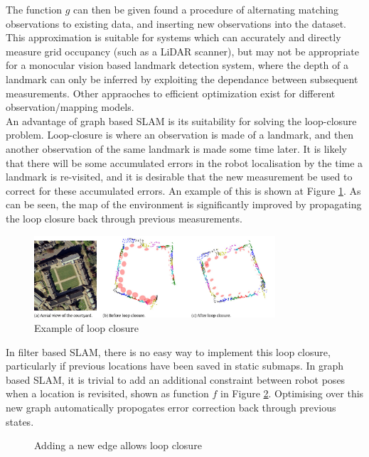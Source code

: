 \documentclass[capstone_report.tex]{subfiles}
\begin{document}
The function $g$ can then be given found a procedure of alternating matching observations to existing data, and inserting new observations into the dataset. This approximation is suitable for systems which can accurately and directly measure grid occupancy (such as a LiDAR scanner), but may not be appropriate for a monocular vision based landmark detection system, where the depth of a landmark can only be inferred by exploiting the dependance between subsequent measurements. Other appraoches to efficient optimization exist for different observation/mapping models.\\

An advantage of graph based SLAM is its suitability for solving the loop-closure problem. Loop-closure is where an observation is made of a landmark, and then another observation of the same landmark is made some time later. It is likely that there will be some accumulated errors in the robot localisation by the time a landmark is re-visited, and it is desirable that the new measurement be used to correct for these accumulated errors. An example of this is shown at Figure \ref{fig:loopClose}. As can be seen, the map of the environment is significantly improved by propagating the loop closure back through previous measurements.

\begin{figure}[H]
   \centering
   \includegraphics[width=0.8\textwidth]{imgs/loopClosure.png}
   \caption{Example of loop closure\label{fig:loopClose}}
\end{figure} 

In filter based SLAM, there is no easy way to implement this loop closure, particularly if previous locations have been saved in static submaps. In graph based SLAM, it is trivial to add an additional constraint between robot poses when a location is revisited, shown as function $f$ in Figure \ref{fig:loopClose2}. Optimising over this new graph automatically propogates error correction back through previous states.

\begin{figure}[H]
\centering
  
  \caption{Adding a new edge allows loop closure\label{fig:loopClose2}}
\end{figure}
\end{document}
